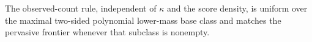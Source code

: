 The observed-count rule, independent of \(\kappa\) and the score density, is uniform over the maximal two-sided polynomial lower-mass base class and matches the pervasive frontier whenever that subclass is nonempty.
